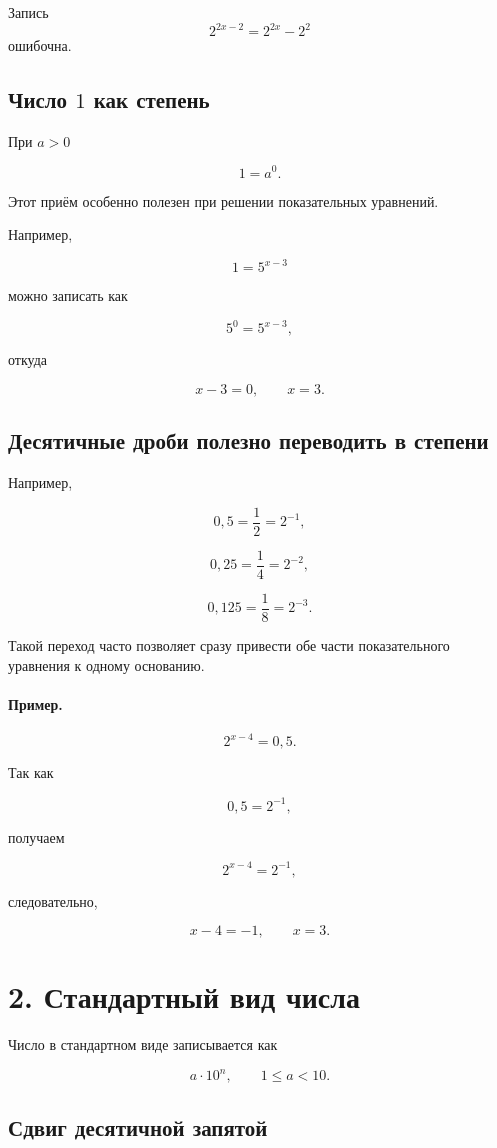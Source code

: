\documentclass[a4paper,12pt]{article}
\begin{document}
Запись
\[
2^{2x-2}=2^{2x}-2^2
\]
ошибочна.

\subsection{Число \(1\) как степень}

При \(a>0\)

\[
1=a^0.
\]

Этот приём особенно полезен при решении показательных уравнений.

Например,

\[
1=5^{x-3}
\]

можно записать как

\[
5^0=5^{x-3},
\]

откуда

\[
x-3=0,
\qquad
x=3.
\]

\subsection{Десятичные дроби полезно переводить в степени}

Например,

\[
0{,}5=\frac12=2^{-1},
\]

\[
0{,}25=\frac14=2^{-2},
\]

\[
0{,}125=\frac18=2^{-3}.
\]

Такой переход часто позволяет сразу привести обе части показательного уравнения к одному основанию.

\paragraph{Пример.}
\[
2^{x-4}=0{,}5.
\]

Так как

\[
0{,}5=2^{-1},
\]

получаем

\[
2^{x-4}=2^{-1},
\]

следовательно,

\[
x-4=-1,
\qquad
x=3.
\]

\section{2. Стандартный вид числа}

Число в стандартном виде записывается как

\[
a\cdot10^n,
\qquad
1\le a<10.
\]

\subsection{Сдвиг десятичной запятой}
\end{document}
